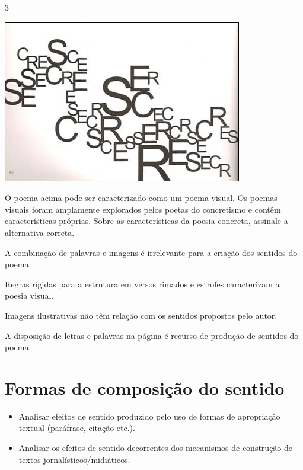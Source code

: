 \num{3}

\includegraphics[width=4.11458in,height=2.80208in]{./imgSAEB_7_POR/media/image3.png}


O poema acima pode ser caracterizado como um poema visual. Os poemas
visuais foram amplamente explorados pelos poetas do concretismo e contêm características próprias. Sobre as características da poesia
concreta, assinale a alternativa correta.

\begin{escolha}

  \item A combinação de palavras e imagens é irrelevante para a criação dos sentidos do poema. 

  \item Regras rígidas para a estrutura em versos rimados e estrofes 
  caracterizam a poesia visual.

  \item Imagens ilustrativas não têm relação com os sentidos propostos 
  pelo autor.

  \item A disposição de letras e palavras na página é recurso de produção de sentidos do poema.

\end{escolha}


\chapter{Formas de composição do sentido}


\begin{itemize}
  
  \item Analisar efeitos de sentido produzido pelo uso de formas de apropriação 
  textual (paráfrase, citação etc.).
  
  \item Analisar os efeitos de sentido decorrentes dos mecanismos de construção 
  de textos jornalísticos/midiáticos.

\end{itemize}


